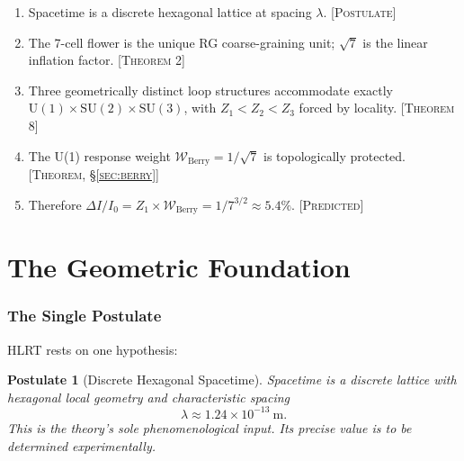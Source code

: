 \documentclass[11pt,letterpaper]{article}
\newtheorem{postulate}{Postulate}
\begin{document}
\vspace{0.5em}
\begin{tcolorbox}[colback=hlrtblue!5!white,colframe=hlrtblue,
                   title={\textbf{The Five-Line Proof}},fonttitle=\bfseries]
\begin{enumerate}[nosep,label=\textbf{\arabic*.}]
\item Spacetime is a discrete hexagonal lattice at spacing $\lambda$. \hfill\textsc{[Postulate]}
\item The 7-cell flower is the unique RG coarse-graining unit;
      $\sqrt{7}$ is the linear inflation factor. \hfill\textsc{[Theorem 2]}
\item Three geometrically distinct loop structures accommodate exactly
      $\mathrm{U}(1)\times\mathrm{SU}(2)\times\mathrm{SU}(3)$, with
      $Z_1 < Z_2 < Z_3$ forced by locality. \hfill\textsc{[Theorem 8]}
\item The U(1) response weight $\mathcal{W}_\mathrm{Berry} = 1/\sqrt{7}$
      is topologically protected. \hfill\textsc{[Theorem, \S\ref{sec:berry}]}
\item Therefore $\Delta I/I_0 = Z_1 \times \mathcal{W}_\mathrm{Berry}
      = 1/7^{3/2} \approx 5.4\%$. \hfill\textsc{[Predicted]}
\end{enumerate}
\end{tcolorbox}

\newpage
\tableofcontents
\newpage

%
%
\part{The Geometric Foundation}

\section{The Single Postulate}

HLRT rests on one hypothesis:

\begin{postulate}[Discrete Hexagonal Spacetime]\label{post:hex}
Spacetime is a discrete lattice with hexagonal local geometry and
characteristic spacing
\begin{equation}
  \lambda \approx 1.24 \times 10^{-13}~\text{m}.
\end{equation}
This is the theory's sole phenomenological input.  Its precise value is
to be determined experimentally.
\end{postulate}
\end{document}
